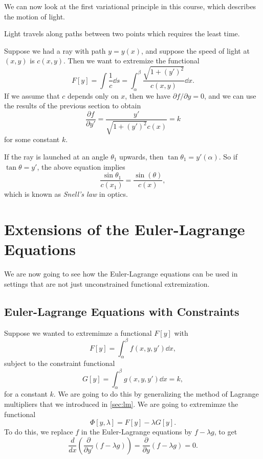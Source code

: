 \documentclass[a4paper]{scrartcl}
\begin{document}
We can now look at the first variational principle in this course, which describes the motion of light.

\begin{law}
Light travels along paths between two points which requires the least time.
\end{law}

Suppose we had a ray with path $y = y(x)$, and suppose the speed of light at $(x, y)$ is $c(x, y)$. Then we want to extremize the functional
$$
F[y] = \int \frac{1}{c} \dd s = \int_{\alpha}^{\beta} \frac{\sqrt{1 + (y')^2}}{c(x, y)} \dd x.
$$
If we assume that $c$ depends only on $x$, then we have $\partial f /\partial y = 0$, and we can use the results of the previous section to obtain
$$
\frac{\partial f}{\partial y'} = \frac{y'}{\sqrt{1 + (y')^2} c(x)} = k
$$
for some constant $k$.

If the ray is launched at an angle $\theta_1$ upwards, then $\tan \theta_1 = y'(\alpha)$. So if $\tan \theta = y'$, the above equation implies
$$
\frac{\sin \theta_1}{c(x_1)} = \frac{\sin(\theta)}{c(x)},
$$
which is known as \emph{Snell's law} in optics.

\section{Extensions of the Euler-Lagrange Equations}

We are now going to see how the Euler-Lagrange equations can be used in settings that are not just unconstrained functional extremization.

\subsection{Euler-Lagrange Equations with Constraints}

Suppose we wanted to extremimze a functional $F[y]$ with
$$
F[y] = \int_{\alpha}^{\beta} f(x, y, y') \dd x,
$$
subject to the constraint functional
$$
G[y] = \int_{\alpha}^{\beta} g(x, y, y') \dd x = k,
$$
for a constant $k$. We are going to do this by generalizing the method of Lagrange multipliers that we introduced in \autoref{sec:lm}. We are going to extremimze the functional
$$
\Phi[y, \lambda] = F[y] - \lambda G[y].
$$
To do this, we replace $f$ in the Euler-Lagrange equations by $f - \lambda g$, to get
$$
\frac{d}{dx}\left(\frac{\partial }{\partial y'}\left(f - \lambda g\right)\right) = \frac{\partial}{\partial y}\left(f - \lambda g\right) = 0.
$$
\end{document}
